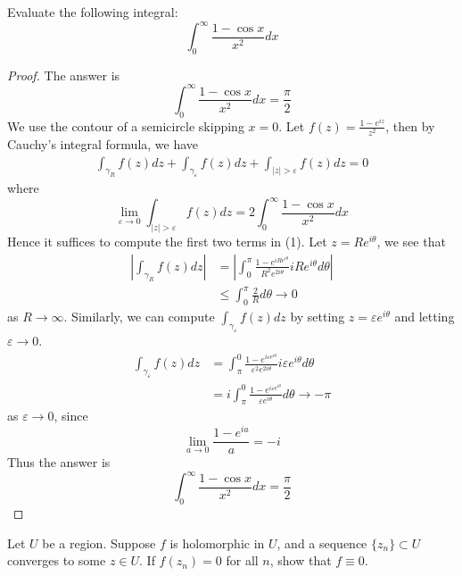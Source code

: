 \documentclass[openany]{book}
\begin{document}
\begin{prob}
    Evaluate the following integral:
    \begin{equation*}
        \int_0^\infty\frac{1-\cos x}{x^2}dx
    \end{equation*}
\end{prob}

\begin{proof}
    The answer is 
    \begin{equation*}
        \int_0^\infty\frac{1-\cos x}{x^2}dx=\frac{\pi}{2}
    \end{equation*}
    We use the contour of a semicircle skipping $x=0$. Let $f(z)=\frac{1-e^{iz}}{z^2}$, then by Cauchy's integral formula, we have 
    \begin{align*}
        \int_{\gamma_R}f(z)dz+\int_{\gamma_\varepsilon}f(z)dz+\int_{|z|>\varepsilon}f(z)dz=0\tag{1}
    \end{align*}
where 
\begin{equation*}
    \lim_{\varepsilon\to 0}\int_{|z|>\varepsilon}f(z)dz=2\int_0^\infty\frac{1-\cos x}{x^2}dx
\end{equation*}
Hence it suffices to compute the first two terms in (1). Let $z=Re^{i\theta}$, we see that 
\begin{align*}
    \left|\int_{\gamma_R}f(z)dz\right|&=\left|\int_0^{\pi}\frac{1-e^{iRe^{i\theta}}}{R^2e^{2i\theta}}iRe^{i\theta}d\theta\right|\\
    &\leq\int_0^\pi\frac{2}{R}d\theta\to 0
\end{align*}
as $R\to\infty$.
Similarly, we can compute $\int_{\gamma_\varepsilon}f(z)dz$ by setting $z=\varepsilon e^{i\theta}$ and letting $\varepsilon\to 0$. 
\begin{align*}
    \int_{\gamma_\varepsilon}f(z)dz&=\int_\pi^{0}\frac{1-e^{i\varepsilon e^{i\theta}}}{\varepsilon^2e^{2i\theta}}i\varepsilon e^{i\theta}d\theta\\
    &=i\int_\pi^0\frac{1-e^{i\varepsilon e^{i\theta}}}{\varepsilon e^{i\theta}}d\theta\to -\pi
\end{align*}
as $\varepsilon\to 0$, since
\begin{equation*}
    \lim_{a\to 0}\frac{1-e^{ia}}{a}=-i
\end{equation*}
Thus the answer is 
\begin{equation*}
    \int_0^\infty\frac{1-\cos x}{x^2}dx=\frac{\pi}{2}
\end{equation*}
\end{proof}


\begin{prob}
    Let $U$ be a region. Suppose $f$ is holomorphic in $U$, and a sequence $\{z_n\}\subset U$ converges to some $z\in U$. If $f(z_n)=0$ for all $n$, show that $f\equiv 0$.
\end{prob}
\end{document}
